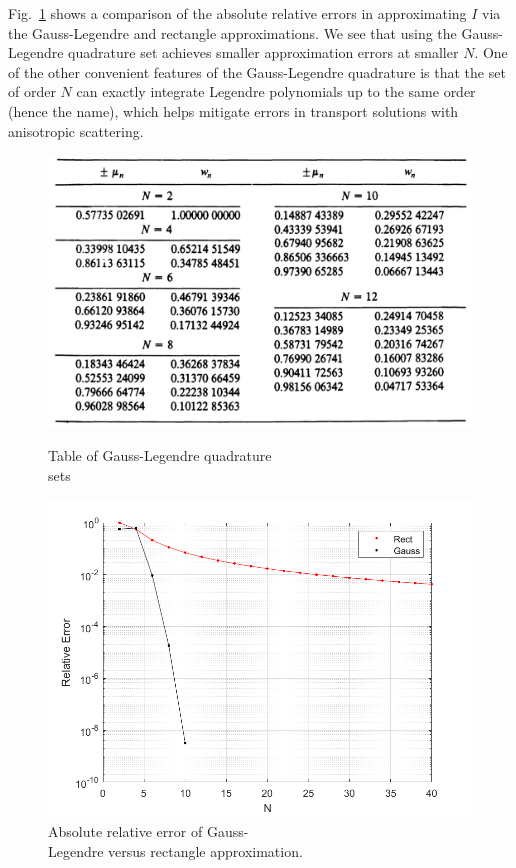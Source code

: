 \documentclass{article}
\begin{document}
Fig.~\ref{fig5} shows a comparison of the absolute relative errors in approximating $I$ via the Gauss-Legendre and rectangle approximations. We see that using the Gauss-Legendre quadrature set achieves smaller approximation errors at smaller $N$. One of the other convenient features of the Gauss-Legendre quadrature is that the set of order $N$ can exactly integrate Legendre polynomials up to the same order (hence the name), which helps mitigate errors in transport solutions with anisotropic scattering.
\begin{figure}[h!]
    \centering
    \begin{minipage}{0.45\textwidth}
        \centering
        \includegraphics[width=1\textwidth]{images/fig4.png}
        \caption{Table of Gauss-Legendre quadrature \\ sets~\cite{Lewis}}
        \label{fig4}
    \end{minipage}\hfill
    \begin{minipage}{0.5\textwidth}
        \centering
        \includegraphics[width=1\textwidth]{images/fig5.png}
        \caption{Absolute relative error of Gauss- \\ Legendre versus rectangle approximation.}
        \label{fig5}
    \end{minipage}
\end{figure}
\end{document}
